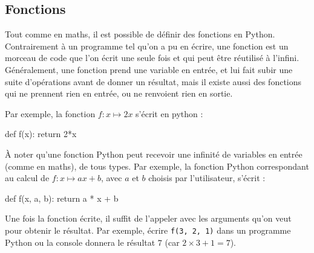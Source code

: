 \documentclass[12pt,a4paper, oneside]{article}
\theoremstyle{definition}
\begin{document}
   \subsection{Fonctions}\label{subsec:fonctions}
   Tout comme en maths, il est possible de définir des fonctions en Python.
   Contrairement à un programme tel qu'on a pu en écrire, une fonction est un morceau de code que l'on écrit une seule fois et qui peut être réutilisé à l'infini.
   Généralement, une fonction prend une variable en entrée, et lui fait subir une suite d'opérations avant de donner un résultat, mais il existe aussi des fonctions qui ne prennent rien en entrée, ou ne renvoient rien en sortie.

   \newpage

   Par exemple, la fonction $f:x\mapsto 2x$ s'écrit en python :
   \begin{pyverbatim}
     def f(x):
       return 2*x
   \end{pyverbatim}

   À noter qu'une fonction Python peut recevoir une infinité de variables en entrée (comme en maths), de tous types.
      Par exemple, la fonction Python correspondant au calcul de ${f : x\mapsto ax+b}$, avec $a$ et $b$ choisis par l'utilisateur, s'écrit :
   \begin{pyverbatim}
     def f(x, a, b):
       return a * x + b
   \end{pyverbatim}
      
      Une fois la fonction écrite, il suffit de l'appeler avec les arguments qu'on veut pour obtenir le résultat.
      Par exemple, écrire \texttt{f(3, 2, 1)} dans un programme Python ou la console donnera le résultat $7$ (car $2\times 3 + 1 = 7$).
   
\end{document}
